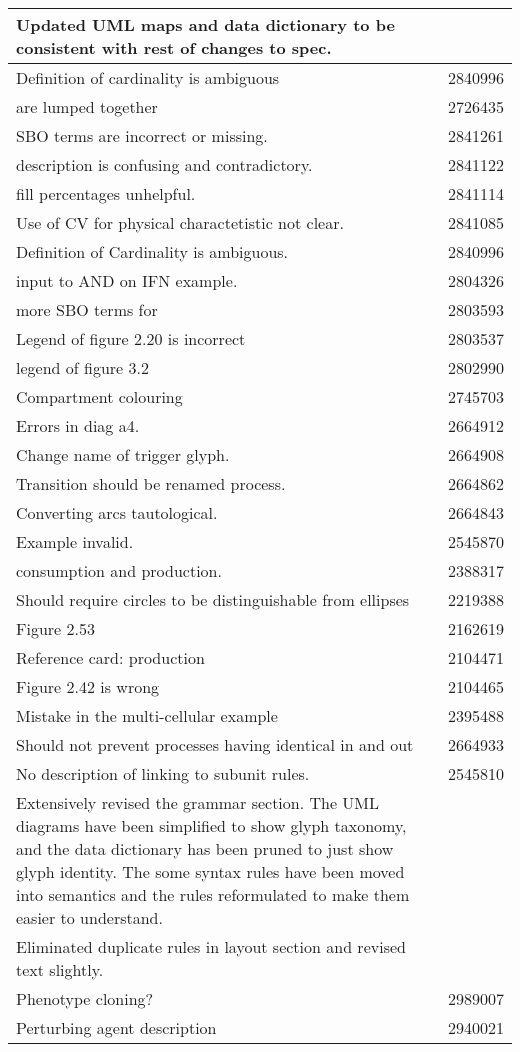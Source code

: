 \begin{center}
\begin{supertabular}{|p{12cm}|c|}
Updated UML maps and data dictionary  to be consistent with rest
of changes to spec. & \\\hline
Definition of cardinality is ambiguous & 2840996 \\\hline
{} are lumped together & 2726435 \\\hline
SBO terms are incorrect or missing. & 2841261 \\\hline
{} description is confusing and contradictory. & 2841122
\\\hline
{} fill percentages unhelpful. & 2841114 \\\hline
Use of CV for physical charactetistic not clear. & 2841085 \\\hline
Definition of Cardinality is ambiguous. & 2840996 \\\hline
input to AND on IFN example. & 2804326 \\\hline
more SBO terms for  & 2803593 \\\hline
Legend of figure 2.20 is incorrect & 2803537 \\\hline
legend of figure 3.2 & 2802990 \\\hline
Compartment colouring & 2745703 \\\hline
Errors in diag a4. & 2664912 \\\hline
Change name of trigger glyph. & 2664908 \\\hline
Transition should be renamed process. & 2664862 \\\hline
Converting arcs tautological. & 2664843 \\\hline
Example invalid. & 2545870 \\\hline
consumption and production. & 2388317 \\\hline
Should require circles to be distinguishable from ellipses & 2219388
\\\hline
Figure 2.53 & 2162619 \\\hline
Reference card: production & 2104471 \\\hline
Figure 2.42 is wrong & 2104465 \\\hline
Mistake in the multi-cellular example  & 2395488 \\\hline
Should not prevent processes having identical in and out & 2664933
\\\hline
No description of linking to subunit rules. & 2545810 \\\hline
Extensively revised the grammar section. The UML diagrams have been simplified to show glyph taxonomy, and the data dictionary has been pruned to just show glyph identity. The some syntax rules have been moved into semantics and the rules reformulated to make them easier to understand. & \\\hline
Eliminated duplicate rules in layout section and revised text
slightly. & \\\hline
Phenotype cloning? & 2989007 \\\hline
Perturbing agent description & 2940021 \\\hline
\end{supertabular}
\end{center}

